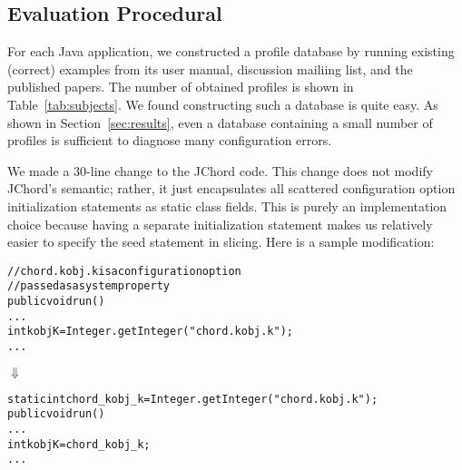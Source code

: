 \subsection{Evaluation Procedural}

For each Java application, we constructed a profile database
by running existing (correct) examples from its user manual, discussion
mailiing list, and the published papers. The number of obtained
 profiles is shown in Table~\ref{tab:subjects}. We
found constructing such a database is quite easy. As shown
in Section~\ref{sec:results}, even a database containing
a small number of profiles is sufficient to
diagnose many configuration errors.


We made a 30-line change to the JChord code. This change
does not modify JChord's semantic; rather, it just encapsulates
all scattered configuration option initialization statements 
as static class fields. This is purely an implementation
choice because having a separate initialization statement
makes us relatively easier to specify the seed statement
in slicing. Here is a sample modification:



\begin{CodeOut}
\begin{alltt}
   // chord.kobj.k is a configuration option
   // passed as a system property
   public void run() \ttlcb
     ...
     int kobjK = Integer.getInteger("chord.kobj.k");
     ...
   \ttrcb
\end{alltt}
\end{CodeOut}
\vspace{-4mm}
\hspace{20mm}$\Downarrow$ 
\begin{CodeOut}
\begin{alltt}
   static int chord\_kobj\_k = Integer.getInteger("chord.kobj.k");
   public void run() \ttlcb
     ...
     int kobjK = chord\_kobj\_k; 
     ...
   \ttrcb
\end{alltt}
\end{CodeOut}






